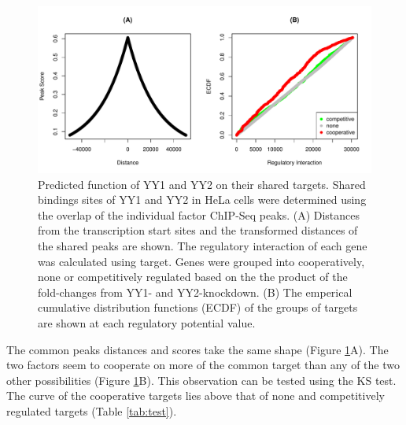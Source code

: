 \documentclass[9pt,a4paper,]{extarticle}
\newenvironment{Shaded}{\begin{snugshade}}{\end{snugshade}}
\newcommand{\CommentTok}[1]{\textcolor[rgb]{0.56,0.35,0.01}{\textit{#1}}}
\newcommand{\DataTypeTok}[1]{\textcolor[rgb]{0.13,0.29,0.53}{#1}}
\newcommand{\KeywordTok}[1]{\textcolor[rgb]{0.13,0.29,0.53}{\textbf{#1}}}
\newcommand{\NormalTok}[1]{#1}
\newcommand{\OperatorTok}[1]{\textcolor[rgb]{0.81,0.36,0.00}{\textbf{#1}}}
\newcommand{\StringTok}[1]{\textcolor[rgb]{0.31,0.60,0.02}{#1}}
\begin{document}
\begin{figure}

{\centering \includegraphics[width=1\linewidth]{targetFlow_files/figure-latex/function-1} 

}

\caption{Predicted function of YY1 and YY2 on their shared targets. Shared bindings sites of YY1 and YY2 in HeLa cells were determined using the overlap of the individual factor ChIP-Seq peaks. (A) Distances from the transcription start sites and the transformed distances of the shared peaks are shown. The regulatory interaction of each gene was calculated using target. Genes were grouped into cooperatively, none or competitively regulated based on the the product of the fold-changes from YY1- and YY2-knockdown. (B) The emperical cumulative distribution functions (ECDF) of the groups of targets are shown at each regulatory potential value.}\label{fig:function}
\end{figure}

The common peaks distances and scores take the same shape (Figure \ref{fig:function}A). The two factors seem to cooperate on more of the common target than any of the two other possibilities (Figure \ref{fig:function}B). This observation can be tested using the KS test. The curve of the cooperative targets lies above that of none and competitively regulated targets (Table \ref{tab:test}).

\begin{Shaded}
\end{Shaded}
\end{document}

